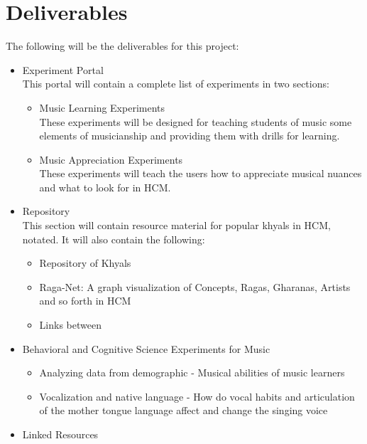 \documentclass{tufte-handout}
\begin{document}
\section{Deliverables}
The following will be the deliverables for this project:
\begin{itemize}

\item Experiment Portal\\
This portal will contain a complete list of experiments in two sections:
\begin{itemize}
\item Music Learning Experiments\\
These experiments will be designed for teaching students of music some elements of musicianship and providing them with drills for learning.
\item Music Appreciation Experiments\\
These experiments will teach the users how to appreciate musical nuances and what to look for in HCM.

\end{itemize}
\item Repository\\
This section will contain resource material for popular khyals in HCM, notated. It will also contain the following:
\begin{itemize}
\item Repository of Khyals
\item Raga-Net: A graph visualization of Concepts, Ragas, Gharanas, Artists and so forth in HCM
\item Links between 
\end{itemize}

\item Behavioral and Cognitive Science Experiments for Music\\
\begin{itemize}
\item Analyzing data from demographic - Musical abilities of music learners 
\item Vocalization and native language - How do vocal habits and articulation of the mother tongue language affect and change the singing voice

\end{itemize}

\item Linked Resources\\

\end{itemize}
\end{document}
